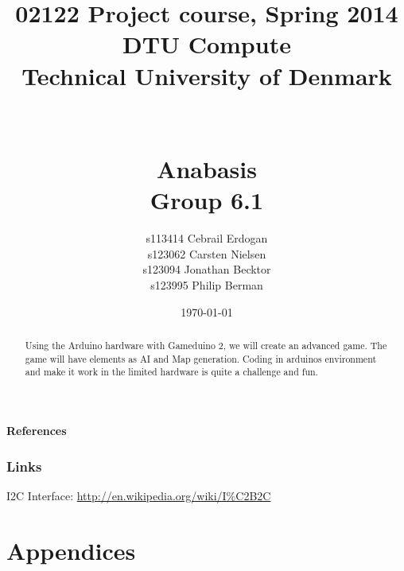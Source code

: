 \documentclass[12pt]{report}
\title{02122 Project course, Spring 2014 \\
DTU Compute \\
Technical University of Denmark \\~\\~\\ Anabasis \\ Group 6.1}
\author{s113414 Cebrail Erdogan \\
        s123062 Carsten Nielsen \\
        s123094 Jonathan Becktor\\
        s123995 Philip Berman   \\  }
\date{\today}
\begin{document}
\pagestyle{headings}



\maketitle

\begin{abstract}
Using the Arduino hardware with Gameduino 2, we will create an advanced game.
The game will have elements as AI and Map generation.
Coding in arduinos environment and make it work in the
limited hardware is quite a challenge and fun.
\end{abstract}


\tableofcontents

\newpage



\newpage



















\newpage

\textbf{References}

\subsection*{Links}


I2C Interface: \url{http://en.wikipedia.org/wiki/I%C2B2C}

\newpage
\chapter{Appendices}
\end{document}
